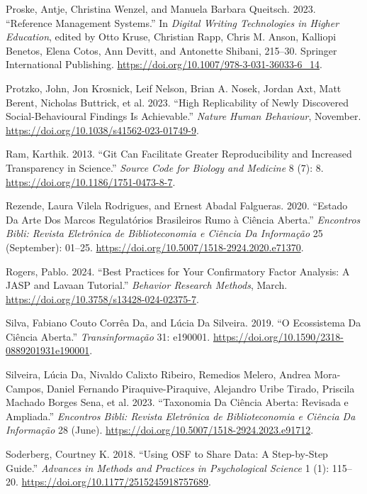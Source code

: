 \documentclass[
  a4paper,
]{article}
\newlength{\cslhangindent}
\newenvironment{CSLReferences}[2] %
 {\begin{list}{}{%
  \setlength{\itemindent}{0pt}
  \setlength{\leftmargin}{0pt}
  \setlength{\parsep}{0pt}
  \ifodd #1
   \setlength{\leftmargin}{\cslhangindent}
   \setlength{\itemindent}{-1\cslhangindent}
  \fi
  \setlength{\itemsep}{#2\baselineskip}}}
 {\end{list}}
\begin{document}
\begin{CSLReferences}{1}{0}
Proske, Antje, Christina Wenzel, and Manuela Barbara Queitsch. 2023.
{``Reference Management Systems.''} In \emph{Digital Writing
Technologies in Higher Education}, edited by Otto Kruse, Christian Rapp,
Chris M. Anson, Kalliopi Benetos, Elena Cotos, Ann Devitt, and Antonette
Shibani, 215--30. Springer International Publishing.
\url{https://doi.org/10.1007/978-3-031-36033-6_14}.

Protzko, John, Jon Krosnick, Leif Nelson, Brian A. Nosek, Jordan Axt,
Matt Berent, Nicholas Buttrick, et al. 2023. {``High Replicability of
Newly Discovered Social-Behavioural Findings Is Achievable.''}
\emph{Nature Human Behaviour}, November.
\url{https://doi.org/10.1038/s41562-023-01749-9}.

Ram, Karthik. 2013. {``Git Can Facilitate Greater Reproducibility and
Increased Transparency in Science.''} \emph{Source Code for Biology and
Medicine} 8 (7): 8. \url{https://doi.org/10.1186/1751-0473-8-7}.

Rezende, Laura Vilela Rodrigues, and Ernest Abadal Falgueras. 2020.
{``Estado Da Arte Dos Marcos Regulat{ó}rios Brasileiros Rumo {à}
{Ci{ê}ncia Aberta}.''} \emph{Encontros Bibli: Revista Eletr{ô}nica de
Biblioteconomia e Ci{ê}ncia Da Informa{ç}{ã}o} 25 (September): 01--25.
\url{https://doi.org/10.5007/1518-2924.2020.e71370}.

Rogers, Pablo. 2024. {``Best Practices for Your Confirmatory Factor
Analysis: {A JASP} and Lavaan Tutorial.''} \emph{Behavior Research
Methods}, March. \url{https://doi.org/10.3758/s13428-024-02375-7}.

Silva, Fabiano Couto Corrêa Da, and Lúcia Da Silveira. 2019. {``O
Ecossistema Da {Ci{ê}ncia Aberta}.''} \emph{Transinforma{ç}{ã}o} 31:
e190001. \url{https://doi.org/10.1590/2318-0889201931e190001}.

Silveira, Lúcia Da, Nivaldo Calixto Ribeiro, Remedios Melero, Andrea
Mora-Campos, Daniel Fernando Piraquive-Piraquive, Alejandro Uribe
Tirado, Priscila Machado Borges Sena, et al. 2023. {``Taxonomia Da
{Ci{ê}ncia Aberta}: Revisada e Ampliada.''} \emph{Encontros Bibli:
Revista Eletr{ô}nica de Biblioteconomia e Ci{ê}ncia Da Informa{ç}{ã}o}
28 (June). \url{https://doi.org/10.5007/1518-2924.2023.e91712}.

Soderberg, Courtney K. 2018. {``Using OSF to Share Data: A Step-by-Step
Guide.''} \emph{Advances in Methods and Practices in Psychological
Science} 1 (1): 115--20. \url{https://doi.org/10.1177/2515245918757689}.


\end{CSLReferences}
\end{document}
